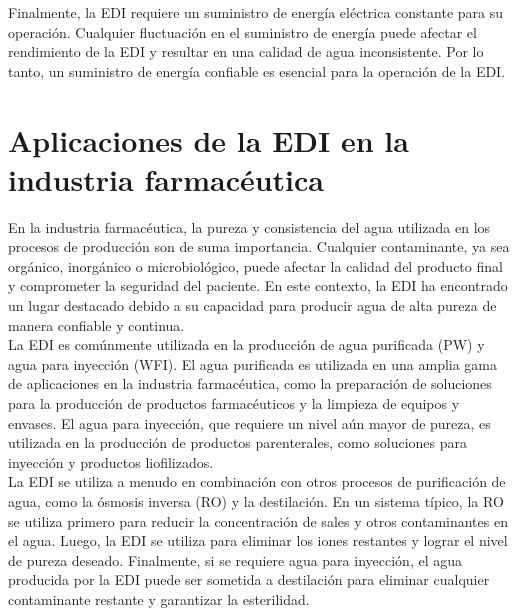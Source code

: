 Finalmente, la EDI requiere un suministro de energía eléctrica constante para su operación. Cualquier fluctuación en el suministro de energía puede afectar el rendimiento de la EDI y resultar en una calidad de agua inconsistente. Por lo tanto, un suministro de energía confiable es esencial para la operación de la EDI. \\

\section{Aplicaciones de la EDI en la industria farmacéutica}
En la industria farmacéutica, la pureza y consistencia del agua utilizada en los procesos de producción son de suma importancia. Cualquier contaminante, ya sea orgánico, inorgánico o microbiológico, puede afectar la calidad del producto final y comprometer la seguridad del paciente. En este contexto, la EDI ha encontrado un lugar destacado debido a su capacidad para producir agua de alta pureza de manera confiable y continua.\\

La EDI es comúnmente utilizada en la producción de agua purificada (PW) y agua para inyección (WFI). El agua purificada es utilizada en una amplia gama de aplicaciones en la industria farmacéutica, como la preparación de soluciones para la producción de productos farmacéuticos y la limpieza de equipos y envases. El agua para inyección, que requiere un nivel aún mayor de pureza, es utilizada en la producción de productos parenterales, como soluciones para inyección y productos liofilizados.\\

La EDI se utiliza a menudo en combinación con otros procesos de purificación de agua, como la ósmosis inversa (RO) y la destilación. En un sistema típico, la RO se utiliza primero para reducir la concentración de sales y otros contaminantes en el agua. Luego, la EDI se utiliza para eliminar los iones restantes y lograr el nivel de pureza deseado. Finalmente, si se requiere agua para inyección, el agua producida por la EDI puede ser sometida a destilación para eliminar cualquier contaminante restante y garantizar la esterilidad.\\

